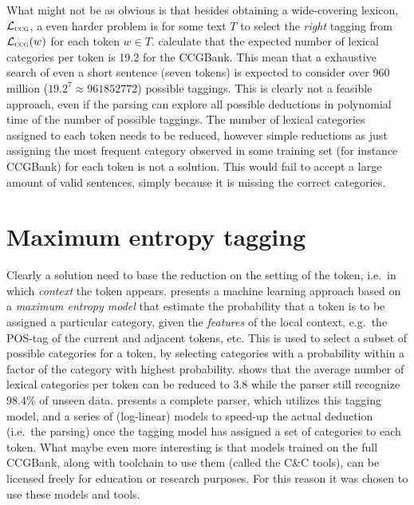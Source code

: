What might not be as obvious is that besides obtaining a wide-covering lexicon, $\mathcal{L}_\textsc{ccg}$, a even harder problem is for some text $T$ to select the \emph{right} tagging from $\mathcal{L}_\textsc{ccg}(w)$ for each token $w \in T$. \citeauthor{ccgBank}  calculate that the expected number of lexical categories per token is 19.2 for the CCGBank. This mean that a exhaustive search of even a short sentence (seven tokens) is expected to consider over 960 million ($19.2^7 \approx \num{961852772}$) possible taggings. This is clearly not a feasible approach, even if the parsing can explore all possible deductions in polynomial time of the number of possible taggings. %
The number of lexical categories assigned to each token needs to be reduced, however simple reductions as just assigning the most frequent category  observed in some training set (for instance CCGBank) for each token is not a solution. This would fail to accept a large amount of valid sentences, simply because it is missing the correct categories. 

\section{Maximum entropy tagging}
Clearly a solution need to base the reduction on the setting of the token, i.e.\ in which \emph{context} the token appears. \citeauthor{suppertagging}  presents a machine learning approach based on a \emph{maximum entropy model} that estimate the probability that a token is to be assigned a particular category, given the \emph{features} of the local context, e.g.\ the POS-tag of the current and adjacent tokens, etc. This is used to select a subset of possible categories for a token, by selecting categories with a probability within a factor of the category with highest probability. \citeauthor{suppertagging} shows that the average number of lexical categories per token can be reduced to 3.8 while the parser still recognize 98.4\% of unseen data. \citeauthor{candc}  presents a complete parser, which utilizes this tagging model, and a series of (log-linear) models to speed-up the actual deduction (i.e.\ the parsing) once the tagging model has assigned a set of categories to each token. What maybe even more interesting is that models trained on the full CCGBank, along with toolchain to use them (called the C\&C tools), can be licensed freely for education or research purposes. For this reason it was chosen to use these models and tools.

